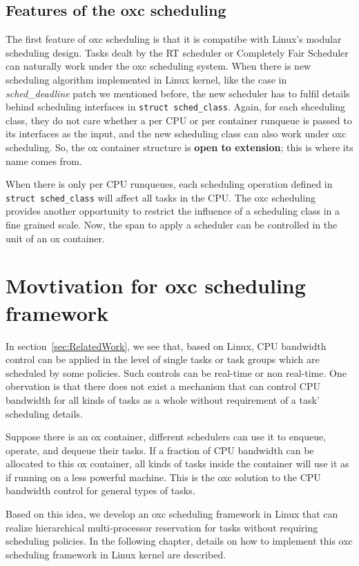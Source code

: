 \subsection{Features of the oxc scheduling\label{sec_design_oxc_features}}

The first feature of oxc scheduling is that it is compatibe with Linux's
modular scheduling design. Tasks dealt by the RT scheduler or Completely Fair
Scheduler can naturally work under the oxc scheduling system. 
When there is new scheduling algorithm implemented in Linux kernel, 
like the case in \emph{sched\_deadline} patch we mentioned before, the
new scheduler has to fulfil details behind scheduling interfaces in 
\texttt{struct sched\_class}. Again, for each shceduling class, they do not
care whether a per CPU or per container runqueue is passed to its 
interfaces as the input, and the new scheduling class can also work under 
oxc scheduling. So, the ox container structure is {\bf open to extension}; 
this is where its name comes from.

When there is only per CPU runqueues, each scheduling operation defined 
in \texttt{struct sched\_class} will affect all tasks in the CPU. The
oxc scheduling provides another opportunity to restrict the influence of
a scheduling class in a fine grained scale. Now, the span to apply a 
scheduler can be controlled in the unit of an ox container. 

\section{Movtivation for oxc scheduling framework}
In section~\ref{sec:RelatedWork}, we see that, based on Linux, CPU bandwidth 
control can be applied in the level of single tasks or task groups which 
are scheduled by some policies. Such controls can be real-time or non real-time.
One obervation is that there does not exist a mechanism that can
control CPU bandwidth for all kinds of tasks as a whole without requirement of
a task' scheduling details. 

Suppose there is an ox container, different schedulers can use it to enqueue,
operate, and dequeue their tasks. If a fraction of CPU bandwidth can be allocated
to this ox container, all kinds of tasks inside the container will use it as if
running on a less powerful machine. This is the oxc solution to the CPU bandwidth 
control for general types of tasks.

Based on this idea, we develop an oxc scheduling framework in Linux that can 
realize hierarchical multi-processor reservation for tasks without requiring 
scheduling policies. 
In the following chapter, details on how to implement 
this oxc scheduling framework in Linux kernel are described.

